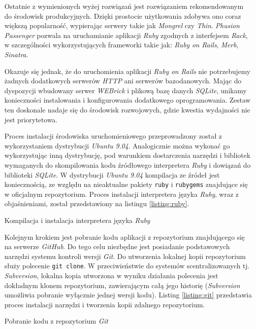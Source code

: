 \documentclass[a4paper,12pt]{article}
\begin{document}
Ostatnie z wymienionych wyżej rozwiązań jest rozwiązaniem
rekomendowanym do środowisk produkcyjnych. Dzięki prostocie
użytkowania zdobywa ono coraz większą popularność, wypierając
serwery takie jak \emph{Mongrel} czy \emph{Thin}. \emph{Phusion
  Passenger} pozwala na uruchamianie aplikacji \emph{Ruby} zgodnych z
interfejsem \emph{Rack}, w szczególności wykorzystujących frameworki
takie jak: \emph{Ruby on Rails}, \emph{Merb}, \emph{Sinatra}.

Okazuje się jednak, że do uruchomienia aplikacji \emph{Ruby on Rails}
nie potrzebujemy żadnych dodatkowych serwerów \emph{HTTP} ani serwerów
bazodanowych. Mając do dyspozycji wbudowany serwer \emph{WEBrick} i
plikową bazę danych \emph{SQLite}, unikamy konieczności instalowania i
konfigurowania dodatkowego oprogramowania. Zestaw ten doskonale nadaje
się do środowisk rozwojowych, gdzie kwestia wydajności nie jest
priorytetowa.

Proces instalacji środowiska uruchomieniowego przeprowadzony został z
wykorzystaniem dystrybucji \emph{Ubuntu 9.04}. Analogicznie można
wykonać go wykorzystując inną dystrybucję, pod warunkiem dostarczenia
narzędzi i bibliotek wymaganych do skompilowania kodu źródłowego
interpretera \emph{Ruby} i dowiązań do biblioteki \emph{SQLite}. W
dystrybucji \emph{Ubuntu 9.04} kompilacja ze źródeł jest
koniecznością, ze względu na nieaktualne pakiety \texttt{ruby} i
\texttt{rubygems} znajdujące się w oficjalnym repozytorium. Proces
instalacji interpretera języka \emph{Ruby}, wraz z objaśnieniami,
został przedstawiony na listingu \ref{listing:ruby}.

\begin{listing}
  
  \caption{Kompilacja i instalacja interpretera języka \emph{Ruby}}
  \label{listing:ruby}
\end{listing}

Kolejnym krokiem jest pobranie kodu aplikacji z repozytorium
znajdującego się na serwerze \emph{GitHub}. Do tego celu niezbędne
jest posiadanie podstawowych narzędzi systemu kontroli wersji
\emph{Git}. Do utworzenia lokalnej kopii repozytorium służy polecenie
\texttt{git clone}. W przeciwieństwie do systemów scentralizowanych
tj. \emph{Subversion}, lokalna kopia utworzona w wyniku działania
polecenia jest dokładnym klonem repozytorium, zawierającym całą jego
historię (\emph{Subversion} umożliwia pobranie wyłącznie jednej wersji
kodu). Listing \ref{listing:git} przedstawia proces instalacji
narzędzi i tworzenia kopii zdalnego repozytorium.

\begin{listing}
  
  \caption{Pobranie kodu z repozytorium \emph{Git}}
  \label{listing:git}
\end{listing}
\end{document}

